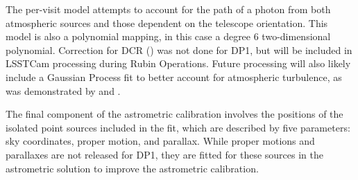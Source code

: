 The per-visit model attempts to account for the path of a photon from both atmospheric sources and those dependent on the telescope orientation.
This model is also a polynomial mapping, in this case a degree 6 two-dimensional polynomial.
Correction for \gls{DCR} () was not done for \gls{DP1}, but will be included in LSSTCam processing during \gls{Rubin Operations}.
Future processing will also likely include a Gaussian Process fit to better account for atmospheric turbulence, as was demonstrated by \citet{Fortino2021} and \citet{Leget2021}.

The final component of the astrometric \gls{calibration} involves the positions of the isolated point sources included in the fit, which are described by five parameters: sky coordinates, proper motion, and parallax.
While proper motions and parallaxes are not released for DP1, they are fitted for these sources in the astrometric solution to improve the astrometric calibration.

